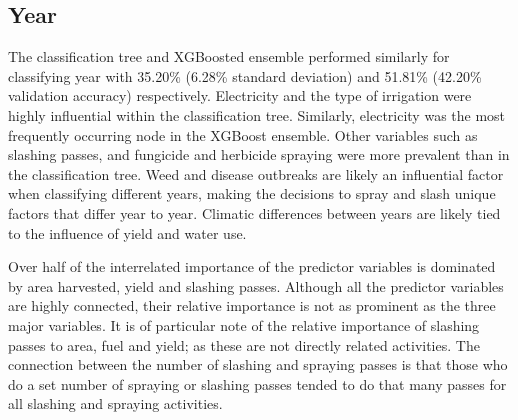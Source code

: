\documentclass[review,12pt,authoryear]{elsarticle}
\begin{document}
\begin{linenumbers}



 \appendix


 \subsection{Year}

 The classification tree and XGBoosted ensemble performed similarly for classifying year with 35.20\% (6.28\% standard deviation) and 51.81\% (42.20\% validation accuracy) respectively. Electricity and the type of irrigation were highly influential within the classification tree. Similarly, electricity was the most frequently occurring node in the XGBoost ensemble. Other variables such as slashing passes, and fungicide and herbicide spraying were more prevalent than in the classification tree. Weed and disease outbreaks are likely an influential factor when classifying different years, making the decisions to spray and slash unique factors that differ year to year. Climatic differences between years are likely tied to the influence of yield and water use.
 \par
 Over half of the interrelated importance of the predictor variables is dominated by area harvested, yield and slashing passes. Although all the predictor variables are highly connected, their relative importance is not as prominent as the three major variables. It is of particular note of the relative importance of slashing passes to area, fuel and yield; as these are not directly related activities. The connection between the number of slashing and spraying passes is that those who do a set number of spraying or slashing passes tended to do that many passes for all slashing and spraying activities.
 

\end{linenumbers}
\end{document}
